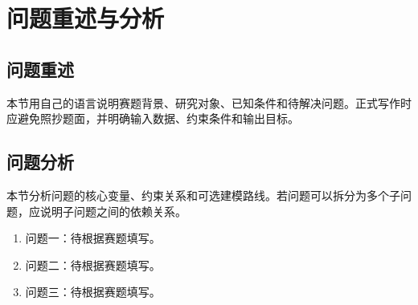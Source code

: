 \section{问题重述与分析}

\subsection{问题重述}
本节用自己的语言说明赛题背景、研究对象、已知条件和待解决问题。正式写作时应避免照抄题面，并明确输入数据、约束条件和输出目标。

\subsection{问题分析}
本节分析问题的核心变量、约束关系和可选建模路线。若问题可以拆分为多个子问题，应说明子问题之间的依赖关系。

\begin{enumerate}
  \item 问题一：待根据赛题填写。
  \item 问题二：待根据赛题填写。
  \item 问题三：待根据赛题填写。
\end{enumerate}
